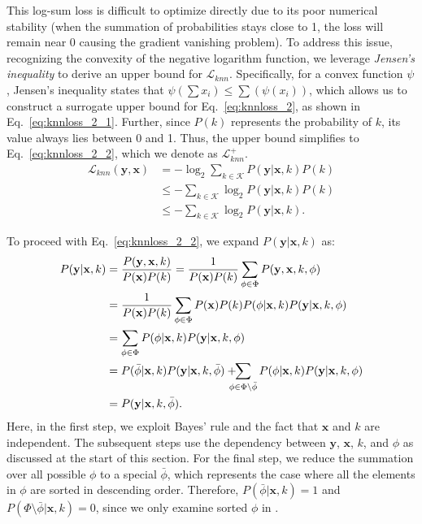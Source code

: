 This log-sum loss is difficult to optimize directly due to its poor numerical stability (when the summation of probabilities stays close to 1, the loss will remain near 0 causing the gradient vanishing problem).  To address this issue, recognizing the convexity of the negative logarithm function, we leverage \emph{Jensen's inequality} to derive an upper bound for $\mathcal{L}_{knn}$. Specifically, for a convex function $\psi$, Jensen's inequality states that $\psi(\sum x_i) \le \sum (\psi(x_i) )$, which allows us to construct a surrogate upper bound for Eq.~\eqref{eq:knnloss_2}, as shown in Eq.~\eqref{eq:knnloss_2_1}. Further, since $P(k)$ represents the probability of $k$, its value always lies between 0 and 1. Thus, the upper bound simplifies to Eq.~\eqref{eq:knnloss_2_2}, which we denote as $\mathcal{L}_{knn}^{+}$.
{\small
\begin{align}
    \mathcal{L}_{knn}(\mathbf{y}, \mathbf{x}) & = -\log_2 \sum_{k \in \mathcal{K}} P(\mathbf{y} | \mathbf{x}, k) P(k) \nonumber\\
    & \le -\sum_{k \in \mathcal{K}} \log_2 P(\mathbf{y} | \mathbf{x}, k) P(k) \label{eq:knnloss_2_1}\\
    & \le -\sum_{k \in \mathcal{K}} \log_2 P(\mathbf{y} | \mathbf{x}, k).\label{eq:knnloss_2_2}
\end{align}
}

To proceed with Eq.~\eqref{eq:knnloss_2_2}, we expand  $P(\mathbf{y} | \mathbf{x}, k)$ as:
{\small
\begin{align}
    P(\mathbf{y} | \mathbf{x}, k) & = \frac{P(\mathbf{y},\mathbf{x},k)}{P(\mathbf{x})P(k)} = \frac{1}{P(\mathbf{x})P(k)} \sum_{\phi \in \Phi} P(\mathbf{y}, \mathbf{x}, k, \phi) \nonumber\\
    & = \frac{1}{P(\mathbf{x})P(k)} \sum_{\phi \in \Phi} P(\mathbf{x}) P(k) P(\phi | \mathbf{x}, k) P(\mathbf{y} | \mathbf{x}, k, \phi) \nonumber\\
    & = \sum_{\phi \in \Phi} P(\phi | \mathbf{x}, k) P(\mathbf{y} | \mathbf{x}, k, \phi) \nonumber\\
    & =  P(\bar{\phi}| \mathbf{x}, k) P(\mathbf{y} | \mathbf{x}, k, \bar{\phi}) + \hspace{-3mm}\sum_{\phi \in \Phi \setminus \bar{\phi}} P(\phi | \mathbf{x}, k) P(\mathbf{y} | \mathbf{x}, k, \phi) \nonumber\\
    & = P(\mathbf{y} | \mathbf{x}, k, \bar{\phi}).\label{eq:knnloss_3}
\end{align}
}
Here, in the first step, we exploit Bayes' rule and the fact that $\mathbf{x}$ and $k$ are independent. The subsequent steps use the dependency between $\mathbf{y}$, $\mathbf{x}$, $k$, and $\phi$ as discussed at the start of this section.  
For the final step, we reduce the summation over all possible $\phi$ to a special $\bar{\phi}$, which represents the case where all the elements in $\phi$ are sorted in descending order. Therefore, $P(\bar{\phi} | \mathbf{x}, k)=1$ and $P(\Phi \setminus \bar{\phi} | \mathbf{x}, k)=0$, since we only examine sorted $\phi$ in \model.


